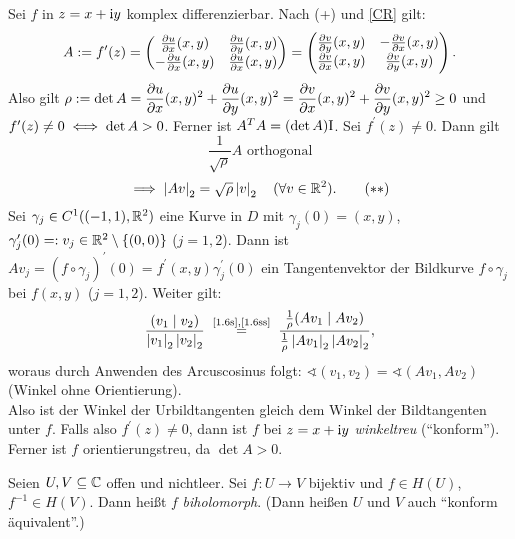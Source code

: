 \documentclass[a4paper,twoside,DIV15,BCOR12mm]{scrbook}
\begin{document}
\begin{bem} \label{bem1.6}
Sei $f$ in $z = x+\mathrm{i} y$ komplex differenzierbar. Nach (+) und \eqref{CR} gilt:
\begin{equation}
A \da f^\prime(z) = \left(\!\!\!\begin{array}{c c}\frac{\partial u}{\partial x}(x,y)&\frac{\partial u}{\partial y}(x,y)\\-\frac{\partial u}{\partial x}(x,y)&\frac{\partial u}{\partial x}(x,y)\end{array}\!\!\!\right) = \left(\!\!\!\begin{array}{c c}\frac{\partial v}{\partial y}(x,y)&-\frac{\partial v}{\partial x}(x,y)\\\frac{\partial v}{\partial x}(x,y)&\frac{\partial v}{\partial y}(x,y)\end{array}\!\!\!\right).
\end{equation}
Also gilt $\rho := \displaystyle \det A = \frac{\partial u}{\partial x}(x,y)^2 + \frac{\partial u}{\partial y}(x,y)^2 =
\frac{\partial v}{\partial x}(x,y)^2 + \frac{\partial v}{\partial y}(x,y)^2 \geq 0$ und \\ $f^\prime(z) \neq 0 \iff \det A > 0$.
Ferner ist $A^TA = (\det A)\mathrm{I}$. Sei $f^\prime(z) \neq 0$. Dann gilt
\[\label{1.6s}\frac{1}{\sqrt{\rho}}A \text{ orthogonal} \tag{$*$}\]
\[\label{1.6ss}\implies \left\lvert Av\right\lvert_2 = \sqrt{\rho} \left\lvert v\right\lvert_2 \quad (\forall v \in \mathbb{R}^2). \tag{$**$}\]
Sei $\gamma_j \in C^1((-1,1), \mathbb{R}^2)$ eine Kurve in $D$ mit $\gamma_j(0) = (x, y)$, $\gamma_j^\prime(0) =: v_j \in \mathbb{R}^2
\setminus \{(0,0)\}$ ($j=1,2$). Dann ist $Av_j = (f \circ \gamma_j)^\prime(0) = f^\prime(x, y) \gamma_j^\prime(0)$ ein
Tangentenvektor der Bildkurve $f \circ \gamma_j$ bei $f(x, y)$ ($j=1,2$). Weiter gilt: \[\frac{(v_1\mid v_2)}{\abs{v_1}_2
  \abs{v_2}_2} \nach{=}{\eqref{1.6s},\eqref{1.6ss}} \frac{\frac1\rho (Av_1\mid Av_2)}{\frac1\rho \abs{Av_1}_2 \abs{Av_2}_2},\]
woraus durch Anwenden des Arcuscosinus folgt: $\sphericalangle(v_1,v_2) = \sphericalangle(Av_1,Av_2)$ (Winkel ohne Orientierung).\\
Also ist der Winkel der Urbildtangenten gleich dem Winkel der Bildtangenten unter $f$. Falls also $f^\prime(z)\neq0$, dann ist
$f$ bei $z=x+\mathrm{i} y$ \emph{winkeltreu} (``konform''). Ferner ist $f$ orientierungstreu, da $\det A > 0$.
\end{bem}

\begin{dfn} \label{dfn1.7}
Seien $U, V \subseteq \mathbb{C}$ offen und nichtleer. Sei $f\colon U \to V$ bijektiv und $f\in H(U)$, $f^{-1}\in H(V)$. Dann heißt $f$ \emph{biholomorph}. (Dann heißen $U$ und $V$ auch ``konform äquivalent''.)
\end{dfn}
\end{document}
